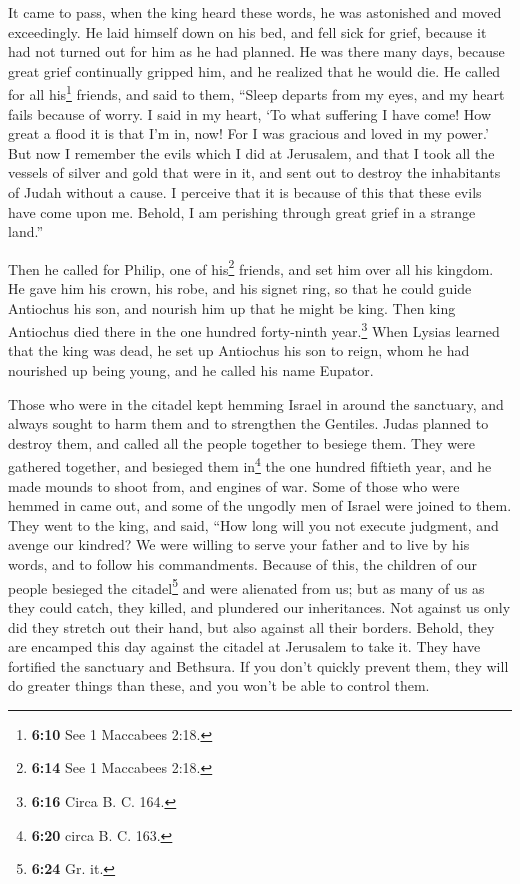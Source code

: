  It came to pass, when the king heard these words, he was
astonished and moved exceedingly. He laid himself down on his bed, and
fell sick for grief, because it had not turned out for him as he had
planned.  He was there many days, because great grief
continually gripped him, and he realized that he would die.
 He called for all his\footnote{\textbf{6:10} See 1
  Maccabees 2:18.} friends, and said to them, ``Sleep departs from my
eyes, and my heart fails because of worry.  I said in my
heart, `To what suffering I have come! How great a flood it is that I'm
in, now! For I was gracious and loved in my power.'  But
now I remember the evils which I did at Jerusalem, and that I took all
the vessels of silver and gold that were in it, and sent out to destroy
the inhabitants of Judah without a cause.  I perceive
that it is because of this that these evils have come upon me. Behold, I
am perishing through great grief in a strange land.''

 Then he called for Philip, one of his\footnote{\textbf{6:14}
  See 1 Maccabees 2:18.} friends, and set him over all his kingdom.
 He gave him his crown, his robe, and his signet ring, so
that he could guide Antiochus his son, and nourish him up that he might
be king.  Then king Antiochus died there in the one
hundred forty-ninth year.\footnote{\textbf{6:16} Circa B. C. 164.}
 When Lysias learned that the king was dead, he set up
Antiochus his son to reign, whom he had nourished up being young, and he
called his name Eupator.

 Those who were in the citadel kept hemming Israel in
around the sanctuary, and always sought to harm them and to strengthen
the Gentiles.  Judas planned to destroy them, and called
all the people together to besiege them.  They were
gathered together, and besieged them in\footnote{\textbf{6:20} circa B.
  C. 163.} the one hundred fiftieth year, and he made mounds to shoot
from, and engines of war.  Some of those who were hemmed
in came out, and some of the ungodly men of Israel were joined to them.
 They went to the king, and said, ``How long will you not
execute judgment, and avenge our kindred?  We were
willing to serve your father and to live by his words, and to follow his
commandments.  Because of this, the children of our
people besieged the citadel\footnote{\textbf{6:24} Gr. it.} and were
alienated from us; but as many of us as they could catch, they killed,
and plundered our inheritances.  Not against us only did
they stretch out their hand, but also against all their borders.
 Behold, they are encamped this day against the citadel
at Jerusalem to take it. They have fortified the sanctuary and Bethsura.
 If you don't quickly prevent them, they will do greater
things than these, and you won't be able to control them.

